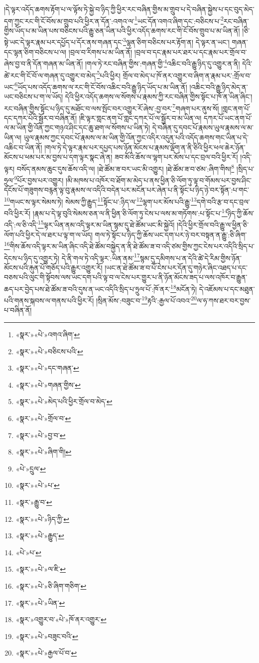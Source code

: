 །དེ་ལྟར་འདོད་ཆགས་རྟོག་པ་ལ་ལྟོས་ཏེ་སྐྱེ་བ་ཉིད་ཀྱི་ཕྱིར་རང་བཞིན་གྱིས་མ་གྲུབ་པ་དེ་བཞིན་སྐྱེས་པ་དང་བུད་མེད་དག་ཀྱང་རང་གི་ངོ་བོས་མ་གྲུབ་པའི་ཕྱིར་ན་དོན་:འགའ་ལ་\footnote{«སྣར་»«པེ་»འགའ་ཞིག་}ཡང་དོན་འགའ་ཞིག་དང་:བཅིངས་པ་\footnote{«སྣར་»«པེ་»བཅིངས་པའི་}རང་བཞིན་གྱིས་ཡོད་པ་མ་ཡིན་པས་བཅིངས་པའི་རྒྱུ་ཅན་ཡིན་པའི་ཕྱིར་འདོད་ཆགས་རང་གི་ངོ་བོས་གྲུབ་པ་མ་ཡིན་ནོ། །ཅི་སྟེ་ཡང་དེ་ལྟར་རྣམ་པར་དཔྱོད་པ་དོར་ནས་གཞན་དང་\footnote{«སྣར་»«པེ་»དང་གཞན་}ལྷན་ཅིག་བཅིངས་པར་རྟོག་ན། དེ་ལྟར་ན་ཡང་། གཞན་དང་ལྷན་ཅིག་བཅིངས་པ་ལ། །བྲལ་བ་རིགས་པ་མ་ཡིན་ནོ། །བྲལ་བ་དང་རྣམ་པར་ཐར་པ་དང་རྣམ་པར་གྲོལ་བ་ཞེས་བྱ་བ་ནི་དོན་གཞན་མ་ཡིན་ནོ། །གལ་ཏེ་རང་བཞིན་གྱིས་:གཞན་གྱི་\footnote{«སྣར་»«པེ་»གཞན་གྱིས་}འཆིང་བའི་རྒྱུ་ཉིད་དུ་འགྱུར་ན་ནི། དེའི་ཚེ་རང་གི་ངོ་བོ་ལ་གཞན་དུ་འགྱུར་བ་མེད་\footnote{«སྣར་»«པེ་»མེད་པའི་ཕྱིར་གྲོལ་བ་མེད་}པའི་ཕྱིར། གྲོལ་བ་མེད་པ་ཁོ་ནར་འགྱུར་བ་ཞིག་ན་རྣམ་པར་:གྲོལ་བ་ཡང་\footnote{«སྣར་»«པེ་»གྲོལ་བ་}ཡོད་པས་འདོད་ཆགས་ལ་རང་གི་ངོ་བོས་འཆིང་བའི་རྒྱུ་ཉིད་ཡོད་པ་མ་ཡིན་ནོ། །འཆིང་བའི་རྒྱུ་ཉིད་མེད་ན་ཡང་བཅིངས་པ་ག་ལ་ཡོད། དེའི་ཕྱིར་འདོད་ཆགས་ལ་སོགས་པ་རྣམས་ཀྱི་རང་བཞིན་གྱིས་སྟོང་པ་ཁོ་ན་ཡིན་ཞིང་། རང་བཞིན་གྱིས་སྟོང་པ་ཉིད་དུ་མཐོང་བ་ལས་སྤོང་བར་འགྱུར་རོ་ཞེས་:བྱ་བར་\footnote{«སྣར་»«པེ་»བྱ་བ་}གཞག་པར་ནུས་སོ། །གླང་ནག་པོ་དང་དཀར་པོའི་སྦྱོར་བ་བཞིན་ནོ། །ཇི་ལྟར་གླང་ནག་པོ་གླང་དཀར་པོ་ལ་སྦྱོར་བ་མ་ཡིན་ལ། དཀར་པོ་ཡང་ནག་པོ་ལ་མ་ཡིན་གྱི་འོན་ཀྱང་གཉའ་ཤིང་དང་ཆུ་ཐག་ལ་སོགས་པ་ཡིན་ཏེ། དེ་བཞིན་དུ་དབང་པོ་རྣམས་ཡུལ་རྣམས་ལ་མ་ཡིན་ལ། ཡུལ་རྣམས་ཀྱང་དབང་པོ་རྣམས་ལ་མ་ཡིན་གྱི་འོན་ཀྱང་འདིར་འདུན་པའི་འདོད་ཆགས་གང་ཡིན་པ་དེ་འཆིང་བ་ཡིན་ནོ། །གལ་ཏེ་དེ་ལྟར་རྣམ་པར་དཔྱད་པས་ཉོན་མོངས་པ་རྣམས་ལྡོག་ན་ནི་ཅིའི་ཕྱིར་ཕལ་ཆེར་ཉོན་མོངས་པ་ཕམ་པར་མ་བྱས་པ་དག་ལྟར་སྣང་ཞེ་ན། ཟབ་མོའི་ཆོས་ལ་ལྷག་པར་མོས་པ་དང་བྲལ་བའི་ཕྱིར་རོ། །འདི་ལྟར། བསོད་ནམས་ཆུང་དུས་ཆོས་འདི་ལ། །ཐེ་ཚོམ་ཟ་བར་ཡང་མི་འགྱུར། །ཐེ་ཚོམ་ཟ་བ་ཙམ་:ཞིག་གིས།\footnote{«སྣར་»«པེ་»ཞིག་གི།} །སྲིད་པ་ཧྲུལ་\footnote{«པེ་»དྲུལ་}པོར་བྱས་པར་འགྱུར། །མི་མཁས་པ་འཁོར་བ་ཐོག་མ་མེད་པ་ནས་ཕྱིན་ཅི་ལོག་ཏུ་ལྟ་བ་གོམས་པར་བྱས་ཤིང་དངོས་པོ་གཟུགས་བརྙན་ལྟ་བུ་རྣམས་ལ་འདིའི་བདེན་པར་མངོན་པར་ཞེན་པ་ནི་སྟོང་པ་ཉིད་ཉེ་བར་སྟོན་:པ་གང་\footnote{«སྣར་»«པེ་»པ་}གཡང་ས་ལྟར་སེམས་ཏེ། སེམས་ཀྱི་རྒྱུད་\footnote{«སྣར་»རྒྱུ་བ་}སྟོང་པ་:ཉིད་ལ་\footnote{«སྣར་»«པེ་»ཉིད་ཀྱི་}ལྷག་པར་མོས་པའི་རྒྱུ་\footnote{«སྣར་»«པེ་»རྒྱུད་}དགེ་བའི་རྩ་བ་དང་བྲལ་བའི་ཕྱིར་རོ། །རྣམ་པ་དེ་ལྟ་བུའི་སེམས་ཅན་ལ་ནི་ཕྱིན་ཅི་ལོག་ཏུ་ངེས་པ་ལས་མ་གཏོགས་:པ་སྟོང་པ་\footnote{«པེ་»པ་}ཉིད་ཀྱི་ཆོས་འདི་:ལ་ཅི་འདི་\footnote{«སྣར་»«པེ་»ལ་ཇི་}ལྟར་ཡིན་ནམ་འདི་ལྟར་མ་ཡིན་སྙམ་དུ་ཐེ་ཚོམ་ཡང་མི་སྐྱེའོ། །དེའི་ཕྱིར་གྲོལ་བའི་རྒྱུ་ལ་ཕྱིན་ཅི་ལོག་པའི་ཕྱིར་དེ་ལ་ཐར་པ་ལྟ་ག་ལ་ཡོད། གལ་ཏེ་སྟོང་པ་ཉིད་ཀྱི་ཆོས་ཡང་དག་པར་ཉེ་བར་བསྟན་ན་རྒྱུ་:ཅི་ཞིག་\footnote{«སྣར་»«པེ་»ཅི་ཞིག་གཅིག་}གིས་ཆོས་འདི་ལྟར་མ་ཡིན་ཞིང་འདི་ཐེ་ཚོམ་བསྐྱེད་ན་ནི་ཐེ་ཚོམ་ཟ་བ་འདི་ཙམ་གྱིས་ཀྱང་ངེས་པར་འདིའི་སྲིད་པ་དེངས་པ་ཉིད་དུ་འགྱུར་ཏེ། དེ་ནི་གལ་ཏེ་འདི་ལྟར་:ཡིན་ནམ་\footnote{«སྣར་»«པེ་»ཡིན་}སྙམ་དུ་དམིགས་པ་ན་དེའི་ཚེ་དེ་རིམ་གྱིས་ཉོན་མོངས་པའི་རྐུན་པོ་གཅོད་པའི་རྒྱུར་འགྱུར་རོ། །ཡང་ན་ཐེ་ཚོམ་ཟ་བ་པོ་ངེས་པར་དོན་དུ་གཉེར་ཞིང་འཐད་པ་དང་བཅས་པའི་ལུང་གི་སྟོབས་ལས་ཡང་དག་པའི་ལྟ་བ་ལ་ངེས་པར་གྱུར་པ་ནི་ཉོན་མོངས་ཟད་པ་ལས་འཁོར་བ་རྒྱུན་ཆད་པར་བྱེད་པས་ཐེ་ཚོམ་ཟ་བའི་དུས་ན་ཡང་འདིའི་སྲིད་པ་ཧྲུལ་པོ་:ཁོ་ནར་\footnote{«སྣར་»འགྱུར་བ་«པེ་»ཁོ་ནར་འགྱུར་}མངོན་ཏེ། དེ་འཇོམས་པ་དང་མཐུན་པའི་གནས་སྐབས་ལ་གནས་པའི་ཕྱིར་རོ། །སྲིན་མོས་:བཟུང་བ་\footnote{«སྣར་»«པེ་»བཟུང་བའི་}རྟའི་:རྒྱལ་པོ་འབའ་\footnote{«སྣར་»«པེ་»རྒྱལ་པོ་བ་}ལ་ཧ་ཀས་ཐར་བར་བྱས་པ་བཞིན་ནོ། 